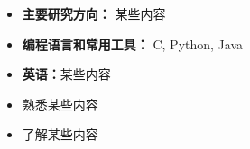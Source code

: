   \begin{itemize}[leftmargin=*]
    \item \textbf{主要研究方向：} 某些内容
    \item \textbf{编程语言和常用工具：} C, Python, Java
    \item \textbf{英语：}某些内容
    \item 熟悉某些内容
    \item 了解某些内容
  \end{itemize}

  